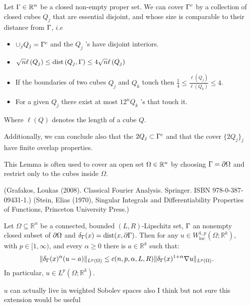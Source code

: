 \begin{lemma} \label{Whitney}Let $\Gamma\in \mathbb{R}^n$ be a closed non-empty proper set. We can cover $\Gamma^c$ by a collection of closed cubes $Q_j$ that are essential disjoint, and whose size is comparable to their distance from $\Gamma$, $i.e$
\begin{itemize}
    \item $\cup_j Q_j=\Gamma^c$ and the $Q_j$ 's have disjoint interiors.
    \item $\sqrt{n} \ell\left(Q_j\right) \leq \operatorname{dist}\left(Q_j, \Gamma\right) \leq 4 \sqrt{n} \ell\left(Q_j\right)$
\item If the boundaries of two cubes $Q_j$ and $Q_k$ touch then $\frac{1}{4} \leq \frac{\ell\left(Q_j\right)}{\ell\left(Q_k\right)} \leq 4$.
\item For a given $Q_j$ there exist at most $12^n Q_k$ 's that touch it.
\end{itemize}
Where $\ell(Q)$ denotes the length of a cube $Q$.

Additionally, we can conclude also that the $2Q_j\subset \Gamma^c$ and that the cover $\{2Q_j\}_j$ have finite overlap properties.
\end{lemma}
\begin{remark}
    This Lemma is often used to cover an open set $\Omega\in \mathbb{R}^n$ by choosing $\Gamma=\partial\Omega$ and restrict only to the cubes inside $\Omega$.
\end{remark}
(Grafakos, Loukas (2008). Classical Fourier Analysis. Springer. ISBN 978-0-387-09431-1.)
(Stein, Elias (1970), Singular Integrals and Differentiability Properties of Functions, Princeton University Press.)


\begin{theorem} \label{WeightedPoincare} Let $\Omega \subseteq \mathbb{R}^n$ be a connected, bounded $(L, R)$-Lipschitz set,  $\Gamma$ an nonempty closed subset of $\partial\Omega$  and $\delta_\Gamma(x)=\operatorname{dist}(x, \partial\Gamma)$. Then for any $u \in W_{\mathrm{loc}}^{1, p}\left(\Omega ; \mathbb{R}^k\right)$, with $p \in[1, \infty)$, and every $\alpha\geq0$ there is $a \in \mathbb{R}^k$ such that:
$$
\|\delta_\Gamma(x)^\alpha (u-a)\|_{L^p(\Omega)} \leq c(n,p,\alpha,L,R)\|\delta_\Gamma(x)^{1+\alpha} \nabla u\|_{L^p(\Omega)} .
$$
In particular, $u \in L^p\left(\Omega ; \mathbb{R}^k\right)$. 
\end{theorem}
\begin{com}
$u$ can actually live in  weighted Sobolev spaces also I think but not sure this extension would be useful
\end{com}

